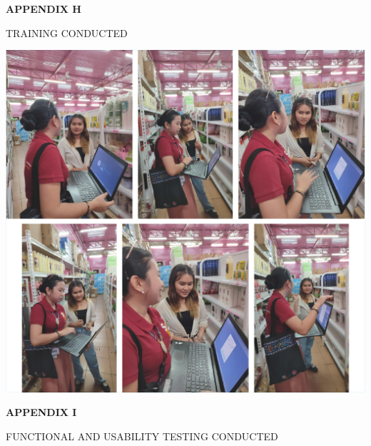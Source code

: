 \clearpage

\begin{center}
	{\bf APPENDIX H}\\[24pt]
\end{center}

\begin{center}
	TRAINING CONDUCTED
\end{center}

\begin{center}
	\includegraphics[width=1\textwidth]{app/H.pdf}
\end{center}

\clearpage

\begin{center}
	{\bf APPENDIX I}\\[24pt]
\end{center}

\begin{center}
	FUNCTIONAL AND USABILITY TESTING CONDUCTED
\end{center}

